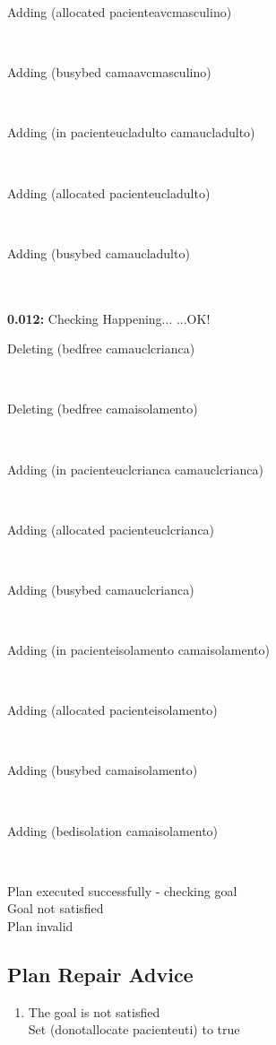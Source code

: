 \documentclass[a4paper,12pt]{article}
\newcommand{\atime}[1]{{\bf #1:}}
\newcommand{\exprn}[1]{{\sf #1}}
\newcommand{\checkhappening}{Checking Happening... }
\newcommand{\listrow}[1]{\begin{minipage}[t]{11.5cm} #1 \end{minipage}}
\newcommand{\happeningOK}{...OK!}
\newcommand{\adding}[1]{\listrow{Adding \exprn{#1} }}
\newcommand{\deleting}[1]{\listrow{Deleting \exprn{#1} }}
\begin{document}
\begin{tabbing}
 \> \adding{(allocated pacienteavcmasculino)}\\
 \> \adding{(busybed camaavcmasculino)}\\
 \> \adding{(in pacienteucladulto camaucladulto)}\\
 \> \adding{(allocated pacienteucladulto)}\\
 \> \adding{(busybed camaucladulto)}\\
\\
\atime{0.012} \> \checkhappening\happeningOK\\
 \> \deleting{(bedfree camauclcrianca)}\\
 \> \deleting{(bedfree camaisolamento)}\\
 \> \adding{(in pacienteuclcrianca camauclcrianca)}\\
 \> \adding{(allocated pacienteuclcrianca)}\\
 \> \adding{(busybed camauclcrianca)}\\
 \> \adding{(in pacienteisolamento camaisolamento)}\\
 \> \adding{(allocated pacienteisolamento)}\\
 \> \adding{(busybed camaisolamento)}\\
 \> \adding{(bedisolation camaisolamento)}\\
\end{tabbing}
Plan executed successfully - checking goal\\
Goal not satisfied
\\
Plan invalid
\subsection{Plan Repair Advice}
\begin{enumerate}
\item The goal is not satisfied\\
Set \exprn{(donotallocate pacienteuti)} to true
\end{enumerate}
\end{document}
